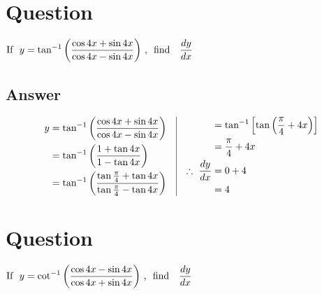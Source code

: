 \documentclass[17pt]{extarticle}
\begin{document}
\noindent
\begin{fleqn} 


\section{Question} 

$\begin{aligned}[t] 
\text{If \ } y =  \tan^{-1}\left(\frac{\cos 4x + \sin 4x}{\cos 4x - \sin 4x}\right) \text{\,, \  find \ \  } \frac{dy}{dx}
\end{aligned}$

\subsection*{Answer}
\begin{equation} \nonumber
\begin{alignedat}{4}
y &= \tan^{-1}\left(\frac{\cos 4x + \sin 4x}{\cos 4x - \sin 4x}\right)\\
  &= \tan^{-1}\left(\frac{1 + \tan 4x}{1 - \tan 4x}\right)\\
  &= \tan^{-1}\left(\frac{\tan \frac{\pi}{4} + \tan 4x}{\tan \frac{\pi}{4} - \tan 4x}\right)\\
\end{alignedat}
\quad
\vrule
\quad 
\begin{alignedat}{4}
&=  \tan^{-1}\left[ \tan \left( \frac{\pi}{4}+4x \right)\right]\\
&=  \frac{\pi}{4}+4x\\
\therefore \  \frac{dy}{dx} &= 0 + 4\\
&=4 \\
\end{alignedat}
\end{equation}
\section{Question} 

$\begin{aligned}[t] 
\text{If \ } y =  \cot^{-1}\left(\frac{\cos 4x - \sin 4x}{\cos 4x + \sin 4x}\right) \text{\,, \  find \ \  } \frac{dy}{dx}
\end{aligned}$


\end{fleqn}
\end{document}
